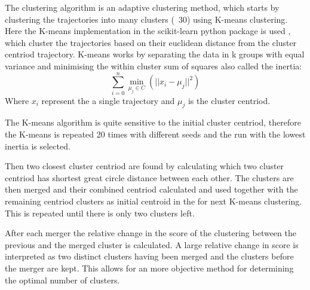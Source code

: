 The \textcite{dorling1992cluster} clustering algorithm is an adaptive clustering method, which starts by clustering the trajectories into many clusters (~30) using K-means clustering. Here the K-means implementation in the scikit-learn python package is used \parencite{scikit-learn}, which cluster the trajectories based on their euclidean distance from the cluster centriod trajectory. K-means works by separating the data in k groups with equal variance and minimising the within cluster sum of squares also called the inertia: 
\begin{equation}
    \sum_{i=0}^{n}\min_{\mu_j \in C}(||x_i - \mu_j||^2)
\end{equation}
Where $x_i$ represent the a single trajectory and $\mu_j$ is the cluster centriod. 

The K-means algorithm is quite sensitive to the initial cluster centriod, therefore the K-means is repeated 20 times with different seeds and the run with the lowest inertia is selected. 

Then two closest cluster centriod are found by calculating which two cluster centriod has shortest great circle distance between each other. The clusters are then merged and their combined centriod calculated and used together with the remaining centriod clusters as initial centroid in the for next K-means clustering. This is repeated until there is only two clusters left. 

After each merger the relative change in the score of the clustering between the previous and the merged cluster is calculated. A large relative change in score is interpreted as two distinct clusters having been merged and the clusters before the merger are kept. This allows for an more objective method for determining the optimal number of clusters.    